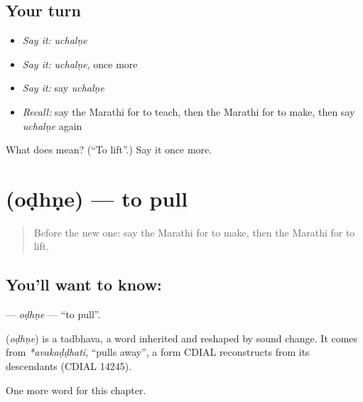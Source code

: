 \subsection*{Your turn}
\begin{itemize}
\raggedright
  \item \emph{Say it:} \emph{uchalṇe}
  \item \emph{Say it:} \emph{uchalṇe}, once more
  \item \emph{Say it:} say \emph{uchalṇe}
  \item \emph{Recall:} say the Marathi for to teach, then the Marathi for to make, then say \emph{uchalṇe} again
\end{itemize}

\begin{tcolorbox}[breakable,colback=teal!4,colframe=teal!35!black,title={Before you move on}]
What does  mean? (\textquotedblleft{}To lift\textquotedblright{}.) Say it once more.
\end{tcolorbox}
\section[\texorpdfstring{\mr{ओढणे} (oḍhṇe)}{ओढणे (oḍhṇe)}]{ (oḍhṇe) — to pull}

\label{lesson:MR-C83-odhne}



\begin{quote}
Before the new one: say the Marathi for to make, then the Marathi for to lift.
\end{quote}

\subsection*{You'll want to know: }
\textbf{} — \emph{oḍhṇe} — \textquotedblleft{}to pull\textquotedblright{}.

\begin{cousinweb}
\textbf{} (\emph{oḍhṇe}) is a tadbhava, a word inherited and reshaped by sound change. It comes from \emph{*avakaḍḍhati}, \textquotedblleft{}pulls away\textquotedblright{}, a form CDIAL reconstructs from its descendants (CDIAL 14245).
\end{cousinweb}

\begin{grammarlens}[title={What you've built}]
One more word for this chapter.
\end{grammarlens}

